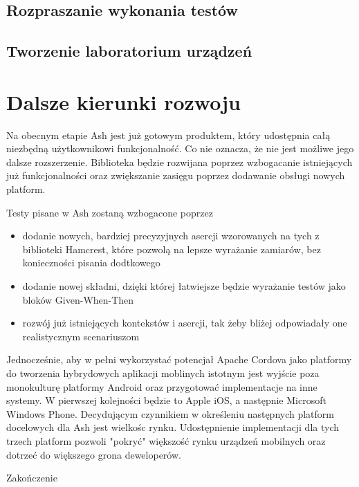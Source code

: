 \documentclass[brudnopis]{xmgr}
\begin{document}
\section{Rozpraszanie wykonania testów}

\section{Tworzenie laboratorium urządzeń}

\chapter{Dalsze kierunki rozwoju}

Na obecnym etapie Ash jest już gotowym produktem, który udostępnia całą niezbędną użytkownikowi funkcjonalność. Co nie oznacza, że nie jest możliwe jego dalsze rozszerzenie. Biblioteka będzie rozwijana poprzez wzbogacanie istniejących już funkcjonalności oraz zwiększanie zasięgu poprzez dodawanie obsługi nowych platform. 

Testy pisane w Ash zostaną wzbogacone poprzez

\begin{itemize}
  \item dodanie nowych, bardziej precyzyjnych asercji wzorowanych na tych z biblioteki Hamcrest, które pozwolą na lepsze wyrażanie zamiarów, bez konieczności pisania dodtkowego
  \item dodanie nowej składni, dzięki której łatwiejsze będzie wyrażanie testów jako bloków Given-When-Then
  \item rozwój już istniejących kontekstów i asercji, tak żeby bliżej odpowiadały one realistycznym scenariuszom 
\end{itemize}

Jednocześnie, aby w pełni wykorzystać potencjał Apache Cordova jako platformy do tworzenia hybrydowych aplikacji moblinych istotnym jest wyjście poza monokulturę platformy Android oraz przygotować implementacje na inne systemy. W pierwszej kolejności będzie to Apple iOS, a następnie Microsoft Windows Phone. Decydującym czynnikiem w określeniu następnych platform docelowych dla Ash jest wielkośc rynku. Udostępnienie implementacji dla tych trzech platform pozwoli "pokryć" większość rynku urządzeń mobilnych oraz dotrzeć do większego grona deweloperów. 

\summary

Zakończenie

\appendix






\oswiadczenie
\end{document}
